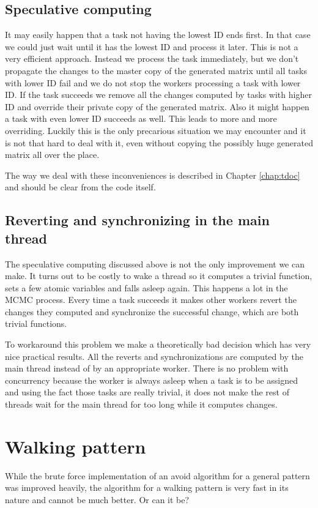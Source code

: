 \subsection{Speculative computing}
It may easily happen that a task not having the lowest ID ends first. In that case we could just wait until it has the lowest ID and process it later. This is not a very efficient approach. Instead we process the task immediately, but we don't propagate the changes to the master copy of the generated matrix until all tasks with lower ID fail and we do not stop the workers processing a task with lower ID. If the task succeeds we remove all the changes computed by tasks with higher ID and override their private copy of the generated matrix. Also it might happen a task with even lower ID succeeds as well. This leads to more and more overriding. Luckily this is the only precarious situation we may encounter and it is not that hard to deal with it, even without copying the possibly huge generated matrix all over the place.

The way we deal with these inconveniences is described in Chapter \ref{chap:tdoc} and should be clear from the code itself.

\subsection{Reverting and synchronizing in the main thread}
The speculative computing discussed above is not the only improvement
we can make. It turns out to be costly to wake a thread so it computes a trivial function, sets a few atomic variables and falls asleep again. This happens a lot in the MCMC process. Every time a task succeeds it makes other workers revert the changes they computed and synchronize the successful change, which are both trivial functions.

To workaround this problem we make a theoretically bad decision which has very nice practical results. All the reverts and synchronizations are computed by the main thread instead of by an appropriate worker. There is no problem with concurrency because the worker is always asleep when a task is to be assigned and using the fact those tasks are really trivial, it does not make the rest of threads wait for the main thread for too long while it computes changes.

\section{Walking pattern}
While the brute force implementation of an avoid algorithm for a general pattern was improved heavily, the algorithm for a walking pattern is very fast in its nature and cannot be much better. Or can it be?

